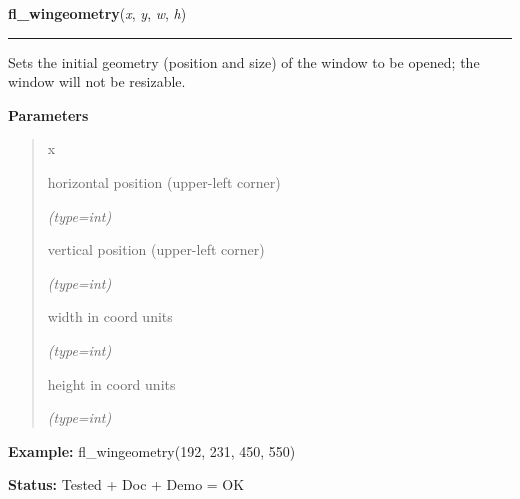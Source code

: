     \vspace{0.5ex}

\hspace{.8\funcindent}\begin{boxedminipage}{\funcwidth}

    \raggedright \textbf{fl\_wingeometry}(\textit{x}, \textit{y}, \textit{w}, \textit{h})

    \vspace{-1.5ex}

    \rule{\textwidth}{0.5\fboxrule}
\setlength{\parskip}{2ex}
    Sets the initial geometry (position and size) of the window to be 
    opened; the window will not be resizable.

\setlength{\parskip}{1ex}
      \textbf{Parameters}
      \vspace{-1ex}

      \begin{quote}
        \begin{Ventry}{x}

          \item[x]

          horizontal position (upper-left corner)

            {\it (type=int)}

          \item[y]

          vertical position (upper-left corner)

            {\it (type=int)}

          \item[w]

          width in coord units

            {\it (type=int)}

          \item[h]

          height in coord units

            {\it (type=int)}

        \end{Ventry}

      \end{quote}

\textbf{Example:} fl\_wingeometry(192, 231, 450, 550)



\textbf{Status:} Tested + Doc + Demo = OK



    \end{boxedminipage}

